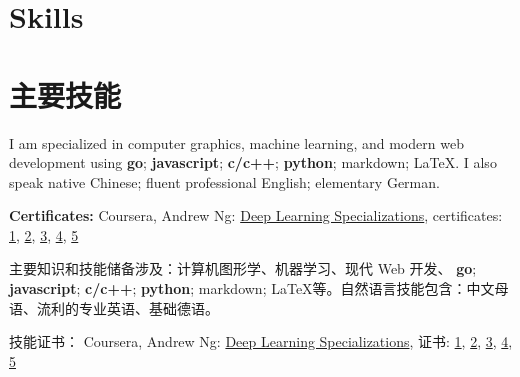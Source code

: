  {
  \section{\textbf{Skills}}
}{
  \section{\textbf{主要技能}}
}

 {

\resumeSubHeadingListStart
\item{
  I am specialized in computer graphics, machine learning, and modern web development using
  \textbf{go}; \textbf{javascript}; \textbf{c/c++}; \textbf{python};
  markdown; \LaTeX. I also speak native Chinese; fluent professional English; elementary German.
}
\item{
  \textbf{Certificates:}{
    Coursera, Andrew Ng: \href{https://www.coursera.org/account/accomplishments/specialization/QGH8ZVJ6J2L2}{Deep Learning Specializations}, certificates:
    \href{https://www.coursera.org/account/accomplishments/verify/YH4NT7HHN263}{1}, 
    \href{https://www.coursera.org/account/accomplishments/verify/QGH3GNGF6BM4}{2}, 
    \href{https://www.coursera.org/account/accomplishments/verify/6VU45R2SZEF6}{3},
    \href{https://www.coursera.org/account/accomplishments/verify/LF3K9BQQDLVL}{4},
    \href{https://www.coursera.org/account/accomplishments/verify/JQFLW2DPYAGW}{5}
  }
}
\resumeSubHeadingListEnd

}{


  \resumeSubHeadingListStart
  \item{
    主要知识和技能储备涉及：计算机图形学、机器学习、现代 Web 开发、
    \textbf{go}; \textbf{javascript}; \textbf{c/c++}; \textbf{python};
    markdown; \LaTeX 等。自然语言技能包含：中文母语、流利的专业英语、基础德语。
  }
  \item{
    技能证书：
      Coursera, Andrew Ng: \href{https://www.coursera.org/account/accomplishments/specialization/QGH8ZVJ6J2L2}{Deep Learning Specializations}, 证书:
      \href{https://www.coursera.org/account/accomplishments/verify/YH4NT7HHN263}{1}, 
      \href{https://www.coursera.org/account/accomplishments/verify/QGH3GNGF6BM4}{2}, 
      \href{https://www.coursera.org/account/accomplishments/verify/6VU45R2SZEF6}{3},
      \href{https://www.coursera.org/account/accomplishments/verify/LF3K9BQQDLVL}{4},
      \href{https://www.coursera.org/account/accomplishments/verify/JQFLW2DPYAGW}{5}
    
  }
  \resumeSubHeadingListEnd

}
